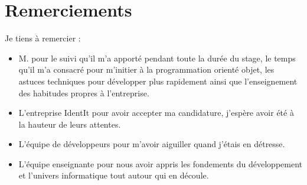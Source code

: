 \chapter*{Remerciements} %
\label{cha:Remerciements}

Je tiens à remercier :
\begin{itemize}
    \item M. pour le suivi qu'il m'a apporté pendant toute la
durée du stage, le temps qu'il m'a consacré pour m'initier à la programmation
orienté objet, les astuces techniques pour développer plus rapidement ainsi que
l'enseignement des habitudes propres à l'entreprise.
    \item L'entreprise IdentIt pour avoir accepter ma candidature, j'espère
avoir été à la hauteur de leurs attentes.
    \item L'équipe de développeurs pour m'avoir aiguiller quand j'étais en
détresse.
    \item L'équipe enseignante pour nous avoir appris les fondements du
développement et l'univers informatique tout autour qui en découle.
\end{itemize}

